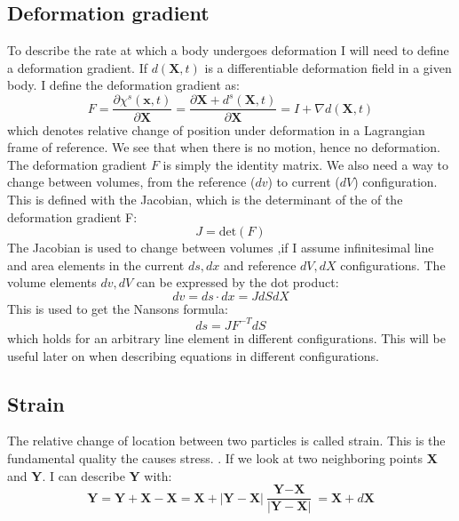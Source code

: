 \subsection{Deformation gradient}
To describe the rate at which a body undergoes deformation I will need to define a deformation gradient.
If $d(\textbf{X},t)$ is a differentiable deformation field in a given body. I define the deformation gradient as:  
\begin{equation}
\label{eq:deformation_gradient}
F = \frac{\partial \chi^s(\textbf{x},t)}{\partial \textbf{X}} = \frac{\partial \textbf{X}  + d^s(\textbf{X} ,t) }{\partial \textbf{X}} =  I + \nabla d(\textbf{X},t) 
\end{equation}
which denotes relative change of position under deformation in a Lagrangian frame of reference. We see that when there is no motion, hence no deformation. The deformation gradient $F$ is simply the identity matrix. \newline
We also need a way to change between volumes, from the reference ($dv$) to current ($dV$) configuration. This is defined with the Jacobian, which is the determinant of the of the deformation gradient F:
\begin{equation}
J = \text{det}(F)
\end{equation}
The Jacobian is used to change between volumes ,if I assume infinitesimal line and area elements in the current $ds, dx$ and reference $dV,dX$ configurations. The volume elements $dv, dV$ can be expressed by the dot product:
\begin{equation}
 dv = ds\cdot dx = J dS dX
\end{equation}
This is used to get the Nansons formula:
\begin{equation}\label{eq:Nanson}
ds = JF^{-T}dS
\end{equation}
which holds for an arbitrary line element in different configurations. This will be useful later on when describing equations in different configurations.

\subsection{Strain}
The relative change of location between two particles is called strain. This is the fundamental quality the causes stress. \cite{Richter2016}. 
If we look at two neighboring points \textbf{X} and \textbf{Y}. I can describe \textbf{Y} with:
\begin{equation}
\textbf{Y} = \textbf{Y} + \textbf{X} - \textbf{X} = \textbf{X} + |\textbf{Y} - \textbf{X}| \frac{\textbf{Y} - \textbf{X}}{|\textbf{Y} - \textbf{X}|} = \textbf{X} + d\textbf{X}
\end{equation}

